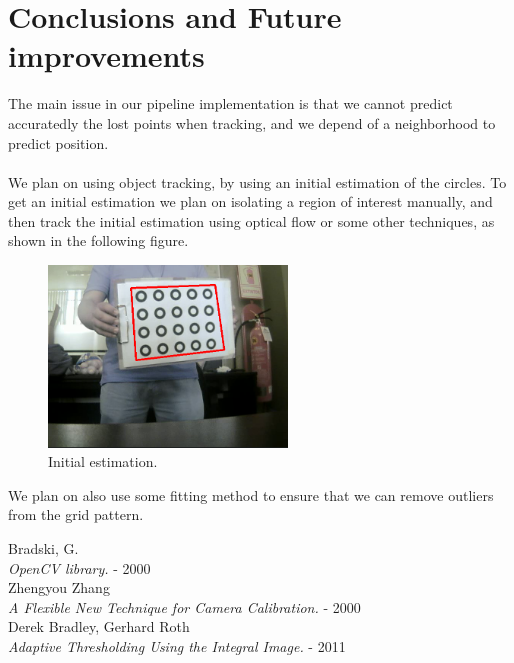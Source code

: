 \documentclass[journal]{IEEEtran}
\begin{document}
\section{Conclusions and Future improvements}
The main issue in our pipeline implementation is that we cannot predict accuratedly the lost points when tracking, and we depend of a neighborhood to predict position.
\\
\\
We plan on using object tracking, by using an initial estimation of the circles. To get an initial estimation we plan on isolating a region of interest manually, and then track the initial estimation using optical flow or some other techniques, as shown in the following figure.
\\
\begin{figure}[H]
\centering
\includegraphics[width=2.5in]{_img/img_results_fut_1.png}
\caption{Initial estimation.}
\end{figure}
%
We plan on also use some fitting method to ensure that we can remove outliers from the grid pattern.


\begin{thebibliography}{1}

  Bradski, G. \\
  \textit{OpenCV library.} - 2000
\\
  Zhengyou Zhang \\
  \textit{A Flexible New Technique for Camera Calibration.} - 2000
\\
  Derek Bradley, Gerhard Roth \\
  \textit{Adaptive Thresholding Using the Integral Image.} - 2011


\end{thebibliography}
\end{document}
